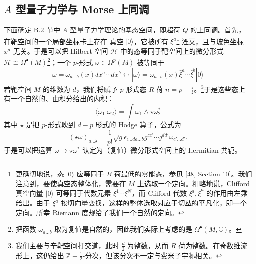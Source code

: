 \subsection{$A$ 型量子力学与 Morse 上同调}
下面确定 B.2 节中 $A$ 型量子力学理论的基态空间，即超荷 $\bar Q$ 的上同调。首先，在靶空间的一个局部坐标卡上存在
真空 $|0\rangle$，它被所有 $\xi^a$\footnote{更确切地说，态 $|0\rangle$ 应等同于 $R$ 荷最低的零能态，参见 [48, Section 10]。我们注意到，要使真空态整体化，需要在 $M$ 上选取一个定向。粗略地说，Clifford 真空向量 $|0\rangle$ 可等同于代数元素 $\xi^1\cdots\xi^N$，而 Clifford 代数 $\xi^a,\bar\xi^a$ 的作用由左乘给出。由于 $\xi^a$ 按切向量变换，这样的整体选取对应于切丛的平凡化，即一个定向。所幸 Riemann 度规给了我们一个自然的定向。} 湮灭，且与玻色坐标 $x^a$ 无关。于是可以把 Hilbert 空间 $\mathcal{H}$ 中的态等同于靶空间上的微分形式 $\mathcal{H}\cong\Omega^\bullet(M)$\footnote{把函数 $\omega_{a\dots b}$ 取为复值是自然的，因此我们实际上考虑的是 $\Omega^\bullet(M,\mathbb{C})$。}；一个 $p$-形式 $\omega\in\Omega^p(M)$ 被等同于
\begin{equation}
  \tag{B.20}
  \omega=\omega_{a\dots b}(x)dx^a\cdots dx^b\leftrightarrow|\omega\rangle=\omega_{a\dots b}(x)\bar\xi^a\cdots\bar\xi^b|0\rangle
\end{equation}
若靶空间 $M$ 的维数为 $d$，我们将赋予 $p$-形式态 $R$ 荷 $n=p-\frac{d}{2}$。\footnote{我们主要与辛靶空间打交道，此时 $\frac{d}{2}$ 为整数，从而 $R$ 荷为整数。在奇数维流形上，这仍给出 $\mathbb{Z}+\frac{1}{2}$-分次，但该分次不一定与费米子宇称相关。}于是这些态上有一个自然的、由积分给出的内积：
\begin{equation}
  \tag{B.21}
  \langle\omega_1|\omega_2\rangle=\int\omega_1\wedge\star\omega_2^*
\end{equation}
其中 $\star$ 是把 $p$-形式映到 $d-p$ 形式的 Hodge 算子，公式为
\begin{equation}
  \tag{B.22}
  (\star\omega)_{a\dots b}=\frac{1}{p!}\sqrt{g}\epsilon_{c\dots d a\dots b}g^{cc'}\cdots g^{dd'}\omega_{c'\dots d'}.
\end{equation}
于是可以把运算 $\omega\to\star\omega^*$ 认定为（复值）微分形式空间上的 Hermitian 共轭。

